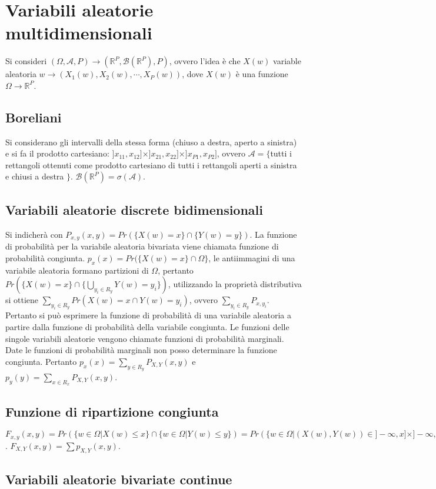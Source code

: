 \chapter{Variabili aleatorie multidimensionali}
Si consideri $(\Omega, \mathcal{A}, P)\rightarrow(\mathbb{R}^P,\mathcal{B}(\mathbb{R}^P), P)$, ovvero l'idea \`e che $X(w)$ variable aleatoria $w\rightarrow (X_1(w), X_2(w),
\cdots, X_P(w))$, dove $X(w)$ \`e una funzione $\Omega\rightarrow\mathbb{R}^P$. 
\section{Boreliani}
Si considerano gli intervalli della stessa forma (chiuso a destra, aperto a sinistra) e si fa il prodotto cartesiano: $]x_{11}, x_{12}]\times]x_{21}, x_{22}]\times]x_{P1}, 
x_{P2}]$, ovvero $\mathcal{A}=\{$tutti i rettangoli ottenuti come prodotto cartesiano di tutti i rettangoli aperti a sinistra e chiusi a destra $\}$. $\mathcal{B}(\mathbb{R}^P)=\sigma(\mathcal{A})$. 
\section{Variabili aleatorie discrete bidimensionali}
Si indicher\`a con $P_{x,y}(x,y)=Pr(\{X(w)=x\}\cap\{Y(w)=y\})$. La funzione di probabilit\`a per la variabile aleatoria bivariata viene chiamata funzione di probabilit\`a
congiunta. $p_x(x)=Pr(\{X(w)=x\}\cap\Omega\}$, le antiimmagini di una variabile aleatoria formano partizioni di $\Omega$, pertanto $Pr(\{X(w)=x\}\cap\{\bigcup\limits_{y_i\in R_y}Y(w)=y_i\})$, utilizzando la propriet\`a distributiva si ottiene $\sum\limits_{y_i\in R_y}Pr(X(w)=x\cap Y(w)=y_i)$, ovvero $\sum\limits_{y_i\in R_y}P_{x,y_i}$. Pertanto 
si pu\`o esprimere la funzione di probabilit\`a di una variabile aleatoria a partire dalla funzione di probabilit\`a della variabile congiunta. Le funzioni delle
singole variabili aleatorie vengono chiamate funzioni di probabilit\`a marginali. Date le funzioni di probabilit\`a marginali non posso determinare la funzione congiunta. 
Pertanto $p_x(x)=\sum\limits_{y\in R_y}P_{X,Y}(x, y)$ e $p_y(y)=\sum\limits_{x\in R_x}P_{X,Y}(x, y)$.
\section{Funzione di ripartizione congiunta}
$F_{x,y}(x,y)=Pr(\{w\in\Omega|X(w)\le x\}\cap\{w\in\Omega|Y(w)\le y\})=Pr(\{w\in\Omega|(X(w), Y(w))\in ]-\infty,x]\times ]-\infty, y]\})$. $F_{X,Y}(x, y)=\sum\limits p_{X,Y}
(x,y)$.
\section{Variabili aleatorie bivariate continue}
